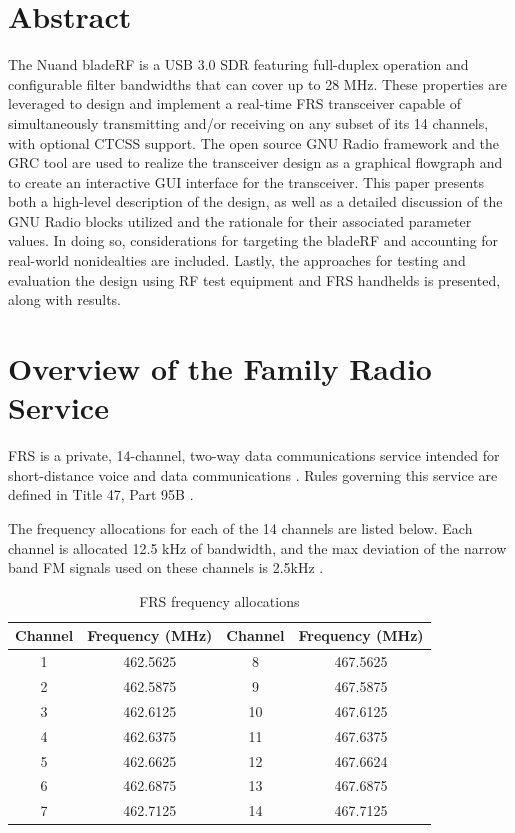 \vspace{0.25in}

\section{Abstract}

The Nuand bladeRF is a USB 3.0 \ac{SDR} featuring full-duplex
operation and configurable filter bandwidths that can cover up to 28 MHz.
These properties are leveraged to design and implement a real-time \ac{FRS}
transceiver capable of simultaneously transmitting and/or receiving on any
subset of its 14 channels, with optional \ac{CTCSS} support. The open source
GNU Radio framework and the \ac{GRC} tool are used to realize the transceiver
design as a graphical flowgraph and to create an interactive GUI interface for
the transceiver. This paper presents both a high-level description of the
design, as well as a detailed discussion of the GNU Radio blocks utilized and
the rationale for their associated parameter values. In doing so,
considerations for targeting the bladeRF and accounting for real-world
nonidealties are included. Lastly, the approaches for testing and evaluation
the design using RF test equipment and FRS handhelds is presented, along with
results.

\cleardoublepage

\section{Overview of the Family Radio Service}

\ac{FRS} is a private, 14-channel, two-way data communications service
intended for short-distance voice and data communications \cite{FCC_FRS}. Rules
governing this service are defined in Title 47, Part 95B \cite{FCC_PART_95B}.

The frequency allocations for each of the 14 channels are listed below. Each
channel is allocated 12.5 kHz of bandwidth, and the max deviation of the
narrow band FM signals used on these channels is 2.5kHz \cite{FCC_PART_95B}.

\begin{table}[h]
  \centering
  \caption{FRS frequency allocations}
  \footnotesize
  \begin{tabular}{|c|c||c|c|}
    \hline
    \textbf{Channel}    & \textbf{Frequency (MHz)} &
    \textbf{Channel}    & \textbf{Frequency (MHz)} \\ \hline
    1 & 462.5625 & 8    & 467.5625 \\ \hline
    2 & 462.5875 & 9    & 467.5875 \\ \hline
    3 & 462.6125 & 10   & 467.6125 \\ \hline
    4 & 462.6375 & 11   & 467.6375 \\ \hline
    5 & 462.6625 & 12   & 467.6624 \\ \hline
    6 & 462.6875 & 13   & 467.6875 \\ \hline
    7 & 462.7125 & 14   & 467.7125 \\ \hline
  \end{tabular}
\end{table}

